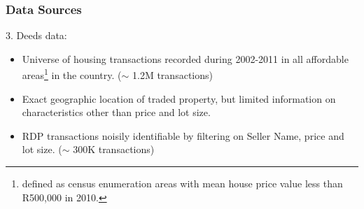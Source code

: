 \documentclass[aspectratio=149]{beamer}
\begin{document}
\begin{frame}
\frametitle{Data Sources}
3. Deeds data:
\vspace{2mm}
  \begin{itemize}
    \item Universe of housing transactions recorded during 2002-2011 in all affordable areas\footnote{defined as census enumeration areas with mean house price value less than R500,000 in 2010.} in the country. ($\sim$\! 1.2M transactions)
    \vspace{2mm}
    \item Exact geographic location of traded property, but limited information on characteristics other than price and lot size.
    \vspace{2mm}
    \item RDP transactions noisily identifiable by filtering on Seller Name, price and lot size. ($\sim$\! 300K transactions)
\end{itemize}
\end{frame}

\end{document}
